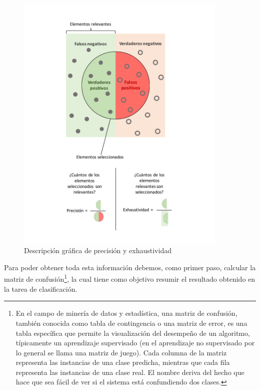 \begin{figure}[H]
  \centering
    \includegraphics[width=0.9\textwidth]{Figuras/Precision}
      \caption{Descripción gráfica de precisión y exhaustividad\cite{preex}}
    \label{fig:precision}
\end{figure}

Para poder obtener toda esta información debemos, como primer paso, calcular la matriz de confusión\footnote{En el campo de minería de datos y estadística, una matriz de confusión, también conocida como tabla de contingencia o una matriz de error, es una tabla específica que permite la visualización del desempeño de un algoritmo, típicamente un aprendizaje supervisado (en el aprendizaje no supervisado por lo general se llama una matriz de juego). Cada columna de la matriz representa las instancias de una clase predicha, mientras que cada fila representa las instancias de una clase real. El nombre deriva del hecho que hace que sea fácil de ver si el sistema está confundiendo dos clases.}, la cual tiene como objetivo resumir el resultado obtenido en la tarea de clasificación. 

